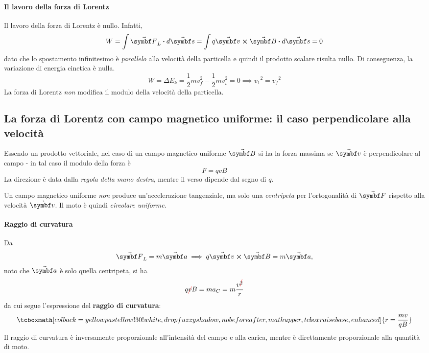 \paragraph{Il lavoro della forza di Lorentz}
Il lavoro della forza di Lorentz è nullo. Infatti,
\begin{equation}
	W=\int \vba{F}_L\vdot d\vba{s}=\int q\vba{v}\cross\vba{B}\vdot d\vba{s}=0
\end{equation}
dato che lo spostamento infinitesimo è \textit{parallelo} alla velocità della particella e quindi il prodotto scalare risulta nullo. Di conseguenza, la variazione di energia cinetica è nulla.
\begin{equation*}
	W=\Delta E_k=\frac{1}{2}mv_{f}^2-\frac{1}{2}mv_{i}^2=0\implies{v_1}^2={v_f}^2
\end{equation*}
La forza di Lorentz \textit{non} modifica il modulo della velocità della particella.
\subsection{La forza di Lorentz con campo magnetico uniforme: il caso perpendicolare alla velocità}
Essendo un prodotto vettoriale, nel caso di un campo magnetico uniforme $\vba{B}$ si ha la forza massima se $\vba{v}$ è perpendicolare al campo - in tal caso il modulo della forza è
\begin{equation*}
	F=qvB
\end{equation*}
La direzione è data dalla \textit{regola della mano destra}, mentre il verso dipende dal segno di $q$.
\begin{observe}
	Un campo magnetico uniforme \textit{non} produce un'accelerazione tangenziale, ma solo una \textit{centripeta} per l'ortogonalità di $\vba{F}$ rispetto alla velocità $\vba{v}$. Il moto è quindi \textit{circolare uniforme}. 
\end{observe}
\paragraph{Raggio di curvatura}
Da
\begin{equation*}
	\vba{F}_L=m\vba{a}\implies q\vba{v}\cross\vba{B}=m\vba{a},
\end{equation*}
noto che $\vba{a}$ è solo quella centripeta, si ha
\begin{equation*}
	q\Ccancel[red]{v}B=ma_C=m\frac{v^{\Ccancel[red]{2}}}{r}
\end{equation*}
da cui segue l'espressione del \textbf{raggio di curvatura}:
\begin{equation}
	\tcboxmath[colback=yellowpastellow!30!white,drop fuzzy shadow, nobeforeafter, math upper, tcbox raise base, enhanced]{r=\frac{mv}{qB}}
\end{equation}
Il raggio di curvatura è inversamente proporzionale all'intensità del campo e alla carica, mentre è direttamente proporzionale alla quantità di moto.
